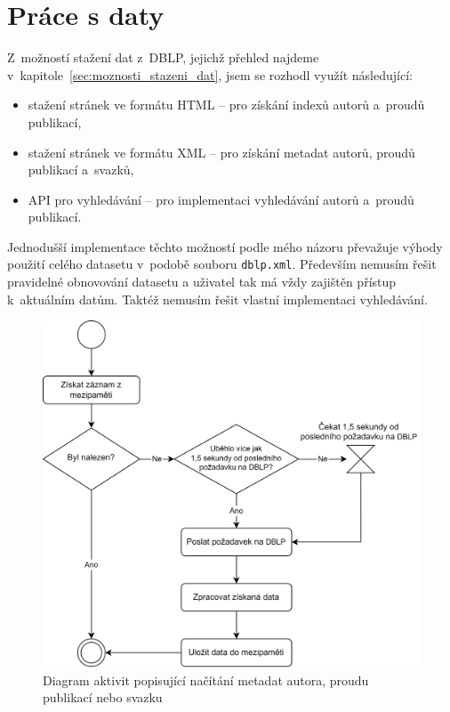\documentclass[
  biblatex,
  sourcecodes,
  glossaries,
  index
]{kidiplom}
\begin{document}
\newpage

\section{Práce s daty}


Z~možností stažení dat z~DBLP, jejichž přehled najdeme v~kapitole~\ref{sec:moznosti_stazeni_dat}, jsem se rozhodl využít následující:

\begin{itemize}
\item stažení stránek ve formátu HTML -- pro získání indexů autorů a~proudů publikací,
\item stažení stránek ve formátu XML -- pro získání metadat autorů, proudů publikací a~svazků,
\item API pro vyhledávání -- pro implementaci vyhledávání autorů a~proudů publikací.
\end{itemize}

Jednodušší implementace těchto možností podle mého názoru převažuje výhody použití celého datasetu v~podobě souboru \texttt{dblp.xml}. Především nemusím řešit pravidelné obnovování datasetu a uživatel tak má vždy zajištěn přístup k~aktuálním datům. Taktéž nemusím řešit vlastní implementaci vyhledávání.

\begin{figure}[H]
\begin{center}
\includegraphics[width=13.4cm]{nacitani_dat}
\caption{Diagram aktivit popisující načítání metadat autora, proudu publikací nebo svazku}\label{fig:nacitani_dat}
\end{center}
\end{figure}
\end{document}
